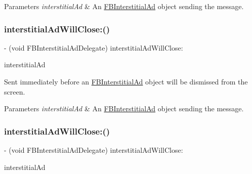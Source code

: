 \begin{DoxyParams}{Parameters}
{\em interstitial\+Ad} & An \hyperlink{interfaceFBInterstitialAd}{F\+B\+Interstitial\+Ad} object sending the message. \\
\hline
\end{DoxyParams}
\mbox{\label{protocolFBInterstitialAdDelegate_01-p_a9552e934440e2bbb01f09b7eb2e3a5a3}} 
\subsubsection{\texorpdfstring{interstitial\+Ad\+Will\+Close\+:()}{interstitialAdWillClose:()}\hspace{0.1cm}{\footnotesize\ttfamily [3/5]}}
{\footnotesize\ttfamily -\/ (void F\+B\+Interstitial\+Ad\+Delegate) interstitial\+Ad\+Will\+Close\+: \begin{DoxyParamCaption}\item[{(\hyperlink{interfaceFBInterstitialAd}{F\+B\+Interstitial\+Ad} $\ast$)}]{interstitial\+Ad }\end{DoxyParamCaption}\hspace{0.3cm}{\ttfamily [optional]}}

Sent immediately before an \hyperlink{interfaceFBInterstitialAd}{F\+B\+Interstitial\+Ad} object will be dismissed from the screen.


\begin{DoxyParams}{Parameters}
{\em interstitial\+Ad} & An \hyperlink{interfaceFBInterstitialAd}{F\+B\+Interstitial\+Ad} object sending the message. \\
\hline
\end{DoxyParams}
\mbox{\label{protocolFBInterstitialAdDelegate_01-p_a9552e934440e2bbb01f09b7eb2e3a5a3}} 
\subsubsection{\texorpdfstring{interstitial\+Ad\+Will\+Close\+:()}{interstitialAdWillClose:()}\hspace{0.1cm}{\footnotesize\ttfamily [4/5]}}
{\footnotesize\ttfamily -\/ (void F\+B\+Interstitial\+Ad\+Delegate) interstitial\+Ad\+Will\+Close\+: \begin{DoxyParamCaption}\item[{(\hyperlink{interfaceFBInterstitialAd}{F\+B\+Interstitial\+Ad} $\ast$)}]{interstitial\+Ad }\end{DoxyParamCaption}\hspace{0.3cm}{\ttfamily [optional]}}

